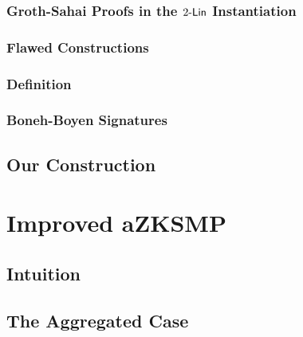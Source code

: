         \subsection{Groth-Sahai Proofs in the $2\mbox{-}\mathsf{Lin}$ Instantiation}
        
            

        \subsection{Flawed Constructions}\label{sec:rs-flawed}
    
            

        \subsection{Definition}
    
            

        \subsection{Boneh-Boyen Signatures} \label{sec:bbs}
    
            

    \section{Our Construction}
    
        


\chapter{Improved aZKSMP} \label{improved-aZKSMP} 

    
        
\section{Intuition} \label{sec:improved-aZKSMP-intuition}
    
    

    \section{The Aggregated Case} \label{sec:log-set-memb-Z}
        
